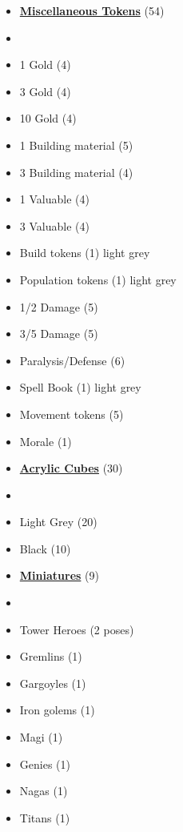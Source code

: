 \begin{multicols}{3}
\begin{itemize}[leftmargin=0pt, label={}, noitemsep]
  \item \textbf{\small{\underline{Miscellaneous Tokens}}} (54)
  \item
  \item 1 Gold (4)
  \item 3 Gold (4)
  \item 10 Gold (4)
  \item 1 Building material (5)
  \item 3 Building material (4)
  \item 1 Valuable (4)
  \item 3 Valuable (4)
  \item Build tokens (1) {light grey}
  \item Population tokens (1) {light grey}
  \item 1/2 Damage (5)
  \item 3/5 Damage (5)
  \item Paralysis/Defense (6)
  \item Spell Book (1) {light grey}
  \item Movement tokens (5)
  \item Morale (1)
\end{itemize}

\begin{itemize}[leftmargin=0pt, label={}, noitemsep]
  \item \textbf{\small{\underline{Acrylic Cubes}}} (30)
  \item
  \item Light Grey (20)
  \item Black (10)
\end{itemize}
\columnbreak
\begin{itemize}[leftmargin=0pt, label={}, noitemsep]
  \item \textbf{\small{\underline{Miniatures}}} (9)
  \item
  \item Tower Heroes (2 poses)
  \item Gremlins (1)
  \item Gargoyles (1)
  \item Iron golems (1)
  \item Magi (1)
  \item Genies (1)
  \item Nagas (1)
  \item Titans (1)
\end{itemize}


\end{multicols}
